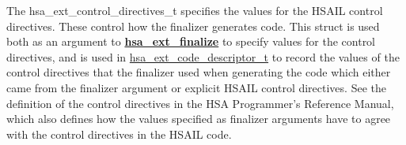 \documentclass[final,oneside]{book}
\newcommand{\reffun}[1]{\textbf{#1}}
\begin{document}
\vspace{-5mm}The hsa_\-ext_\-control_\-directives_\-t specifies the values for the HSAIL control directives. These control how the finalizer generates code. This struct is used both as an argument to \hyperlink{group__ext-finalizer_1ga1e316cdba4ac2ce42f17866aa2e9250d}{\reffun{hsa_\-ext_\-finalize}} to specify values for the control directives, and is used in \hyperlink{group__ext-finalizer_1ga0e01eabc57d7105ea37e1abbb50fa337}{hsa_\-ext_\-code_\-descriptor_\-t} to record the values of the control directives that the finalizer used when generating the code which either came from the finalizer argument or explicit HSAIL control directives. See the definition of the control directives in the HSA Programmer's Reference Manual, which also defines how the values specified as finalizer arguments have to agree with the control directives in the HSAIL code.
\end{document}
